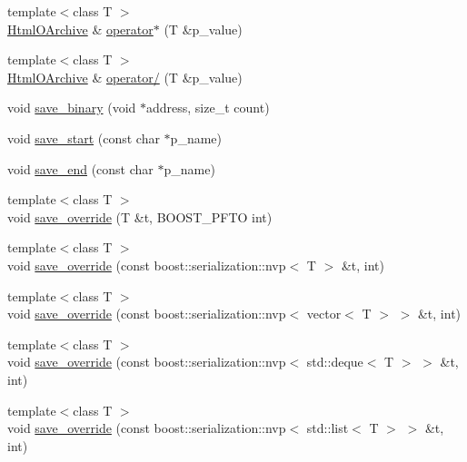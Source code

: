 \begin{DoxyCompactItemize}
\item 
{\footnotesize template$<$class T $>$ }\\\hyperlink{classxtd_1_1servers_1_1app_1_1HtmlOArchive}{Html\+O\+Archive} \& \hyperlink{classxtd_1_1servers_1_1app_1_1HtmlOArchive_ae016000cf5b06b408aa4bfd37c6b354c}{operator$\ast$} (T \&p\+\_\+value)
\item 
{\footnotesize template$<$class T $>$ }\\\hyperlink{classxtd_1_1servers_1_1app_1_1HtmlOArchive}{Html\+O\+Archive} \& \hyperlink{classxtd_1_1servers_1_1app_1_1HtmlOArchive_a5d77d1300bbdbd5e52fec866860bc817}{operator/} (T \&p\+\_\+value)
\item 
void \hyperlink{classxtd_1_1servers_1_1app_1_1HtmlOArchive_a2e5b0b22cf26a77dd62c328a9e51c06f}{save\+\_\+binary} (void $\ast$address, size\+\_\+t count)
\item 
void \hyperlink{classxtd_1_1servers_1_1app_1_1HtmlOArchive_a8675544faff21c5a5acd0af123b48d6d}{save\+\_\+start} (const char $\ast$p\+\_\+name)
\item 
void \hyperlink{classxtd_1_1servers_1_1app_1_1HtmlOArchive_ac5013b8fe0cab7d5c9d7ce3aa4549285}{save\+\_\+end} (const char $\ast$p\+\_\+name)
\item 
{\footnotesize template$<$class T $>$ }\\void \hyperlink{classxtd_1_1servers_1_1app_1_1HtmlOArchive_ace3d9830281bb02de4b775b1ec9891a4}{save\+\_\+override} (T \&t, B\+O\+O\+S\+T\+\_\+\+P\+F\+TO int)
\item 
{\footnotesize template$<$class T $>$ }\\void \hyperlink{classxtd_1_1servers_1_1app_1_1HtmlOArchive_a05042a771dbeccf101cfa84f170f9f85}{save\+\_\+override} (const boost\+::serialization\+::nvp$<$ T $>$ \&t, int)
\item 
{\footnotesize template$<$class T $>$ }\\void \hyperlink{classxtd_1_1servers_1_1app_1_1HtmlOArchive_abde3d494192429180da751c92e31dc63}{save\+\_\+override} (const boost\+::serialization\+::nvp$<$ vector$<$ T $>$ $>$ \&t, int)
\item 
{\footnotesize template$<$class T $>$ }\\void \hyperlink{classxtd_1_1servers_1_1app_1_1HtmlOArchive_ae389e1d1af8f9e39956617521cfefa5e}{save\+\_\+override} (const boost\+::serialization\+::nvp$<$ std\+::deque$<$ T $>$ $>$ \&t, int)
\item 
{\footnotesize template$<$class T $>$ }\\void \hyperlink{classxtd_1_1servers_1_1app_1_1HtmlOArchive_a629a5c1bd96df5f295be173e4f62883e}{save\+\_\+override} (const boost\+::serialization\+::nvp$<$ std\+::list$<$ T $>$ $>$ \&t, int)

\end{DoxyCompactItemize}
